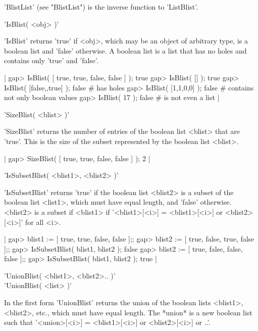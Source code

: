 'BlistList' (see "BlistList") is the inverse function to 'ListBlist'.


'IsBlist( <obj> )'

'IsBlist' returns  'true' if <obj>, which  may be an  object of arbitrary
type, is a boolean list and 'false' otherwise.   A boolean list is a list
that has no holes and contains only 'true' and 'false'.

|    gap> IsBlist( [ true, true, false, false ] );
    true
    gap> IsBlist( [] );
    true
    gap> IsBlist( [false,,true] );
    false    # has holes
    gap> IsBlist( [1,1,0,0] );
    false    # contains not only boolean values
    gap> IsBlist( 17 );
    false    # is not even a list |


'SizeBlist( <blist> )'

'SizeBlist' returns  the number of  entries of  the boolean  list <blist>
that are 'true'.   This  is the size  of  the subset represented  by  the
boolean list <blist>.

|    gap> SizeBlist( [ true, true, false, false ] );
    2 |


'IsSubsetBlist( <blist1>, <blist2> )'

'IsSubsetBlist' returns 'true' if  the boolean list  <blist2> is a subset
of  the boolean list <list1>, which  must have equal  length, and 'false'
otherwise.   <blist2> is  a    subset if  <blist1>  if '<blist1>[<i>]   =
<blist1>[<i>] or <blist2>[<i>]' for all <i>.

|    gap> blist1 := [ true, true, false, false ];;
    gap> blist2 := [ true, false, true, false ];;
    gap> IsSubsetBlist( blist1, blist2 );
    false
    gap> blist2 := [ true, false, false, false ];;
    gap> IsSubsetBlist( blist1, blist2 );
    true |


'UnionBlist( <blist1>, <blist2>.. )' \\
'UnionBlist( <list> )'

In the  first form 'UnionBlist'  returns the union  of the  boolean lists
<blist1>, <blist2>, etc., which must have equal length.  The *union* is a
new boolean list such that '<union>[<i>] = <blist1>[<i>] or <blist2>[<i>]
or ..'.

